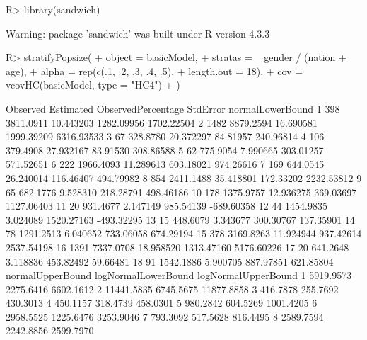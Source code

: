 \documentclass[
]{jss}
\newcommand{\1}{\mathcal{I}} \newcommand{\bZero}{\boldsymbol{0}}
\begin{document}
\begin{CodeChunk}
\begin{CodeInput}
R> library(sandwich)
\end{CodeInput}
\begin{CodeOutput}
Warning: package 'sandwich' was built under R version 4.3.3
\end{CodeOutput}
\begin{CodeInput}
R> stratifyPopsize(
+   object  = basicModel,
+   stratas = ~ gender / (nation + age), 
+   alpha   = rep(c(.1, .2, .3, .4, .5), 
+                 length.out = 18),
+   cov     = vcovHC(basicModel, type = "HC4")
+ )
\end{CodeInput}
\begin{CodeOutput}
   Observed Estimated ObservedPercentage   StdError normalLowerBound
1       398 3811.0911          10.443203 1282.09956       1702.22504
2      1482 8879.2594          16.690581 1999.39209       6316.93533
3        67  328.8780          20.372297   84.81957        240.96814
4       106  379.4908          27.932167   83.91530        308.86588
5        62  775.9054           7.990665  303.01257        571.52651
6       222 1966.4093          11.289613  603.18021        974.26616
7       169  644.0545          26.240014  116.46407        494.79982
8       854 2411.1488          35.418801  172.33202       2232.53812
9        65  682.1776           9.528310  218.28791        498.46186
10      178 1375.9757          12.936275  369.03697       1127.06403
11       20  931.4677           2.147149  985.54139       -689.60358
12       44 1454.9835           3.024089 1520.27163       -493.32295
13       15  448.6079           3.343677  300.30767        137.35901
14       78 1291.2513           6.040652  733.06058        674.29194
15      378 3169.8263          11.924944  937.42614       2537.54198
16     1391 7337.0708          18.958520 1313.47160       5176.60226
17       20  641.2648           3.118836  453.82492         59.66481
18       91 1542.1886           5.900705  887.97851        621.85804
   normalUpperBound logNormalLowerBound logNormalUpperBound
1         5919.9573           2275.6416           6602.1612
2        11441.5835           6745.5675          11877.8858
3          416.7878            255.7692            430.3013
4          450.1157            318.4739            458.0301
5          980.2842            604.5269           1001.4205
6         2958.5525           1225.6476           3253.9046
7          793.3092            517.5628            816.4495
8         2589.7594           2242.8856           2599.7970

\end{CodeOutput}
\end{CodeChunk}
\end{document}

